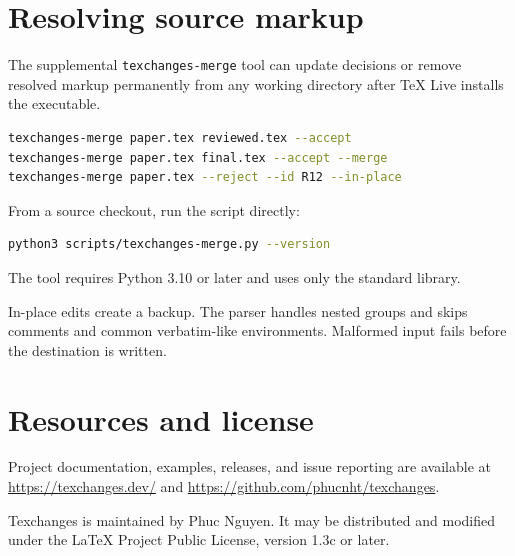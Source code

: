 \documentclass[11pt]{article}
\begin{document}
\section{Resolving source markup}

The supplemental \texttt{texchanges-merge} tool can update decisions or remove
resolved markup permanently from any working directory after TeX Live installs
the executable.

\begin{lstlisting}[language=bash]
texchanges-merge paper.tex reviewed.tex --accept
texchanges-merge paper.tex final.tex --accept --merge
texchanges-merge paper.tex --reject --id R12 --in-place
\end{lstlisting}

From a source checkout, run the script directly:

\begin{lstlisting}[language=bash]
python3 scripts/texchanges-merge.py --version
\end{lstlisting}

The tool requires Python 3.10 or later and uses only the standard library.

In-place edits create a backup. The parser handles nested groups and skips
comments and common verbatim-like environments. Malformed input fails before
the destination is written.

\section{Resources and license}

Project documentation, examples, releases, and issue reporting are available
at \url{https://texchanges.dev/} and
\url{https://github.com/phucnht/texchanges}.

Texchanges is maintained by Phuc Nguyen. It may be distributed
and modified under the LaTeX Project Public License, version 1.3c or later.
\end{document}
